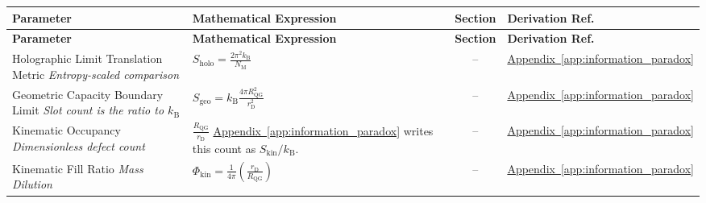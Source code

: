 \vspace{0.5cm}
\noindent
\begin{longtable}{@{} p{4.5cm} p{6cm} c p{4cm} @{}}
\toprule
\textbf{Parameter} & \textbf{Mathematical Expression} & \textbf{Section} & \textbf{Derivation Ref.} \\
\midrule
\endfirsthead
\toprule
\textbf{Parameter} & \textbf{Mathematical Expression} & \textbf{Section} & \textbf{Derivation Ref.} \\
\midrule
\endhead

{\raggedright Holographic Limit Translation Metric \newline \textit{Entropy-scaled comparison}\par} & {\raggedright $S_{\mathrm{holo}} = \frac{2\pi^2 k_{\mathrm{B}}}{N_{\mathrm{M}}}$\par} & -- & {\raggedright \hyperref[app:information_paradox]{Appendix~\ref*{app:information_paradox}}\par} \\

{\raggedright Geometric Capacity Boundary Limit \newline \textit{Slot count is the ratio to $k_{\mathrm B}$}\par} & {\raggedright $S_{\mathrm{geo}} = k_{\mathrm{B}} \frac{4\pi R_{\mathrm{QG}}^2}{r_{\mathrm{D}}^2}$\par} & -- & {\raggedright \hyperref[app:information_paradox]{Appendix~\ref*{app:information_paradox}}\par} \\

{\raggedright Kinematic Occupancy \newline \textit{Dimensionless defect count}\par} & {\raggedright $\frac{R_{\mathrm{QG}}}{r_{\mathrm D}}$ \newline \hyperref[app:information_paradox]{Appendix~\ref*{app:information_paradox}} writes this count as $S_{\mathrm{kin}}/k_{\mathrm B}$.\par} & -- & {\raggedright \hyperref[app:information_paradox]{Appendix~\ref*{app:information_paradox}}\par} \\

{\raggedright Kinematic Fill Ratio \newline \textit{Mass Dilution}\par} & {\raggedright $\Phi_{\mathrm{kin}} = \frac{1}{4\pi} \left(\frac{r_{\mathrm{D}}}{R_{\mathrm{QG}}}\right)$\par} & -- & {\raggedright \hyperref[app:information_paradox]{Appendix~\ref*{app:information_paradox}}\par} \\


\end{longtable}
